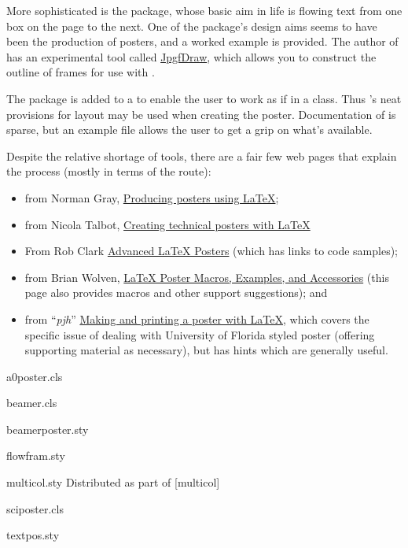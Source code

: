 More sophisticated is the  package, whose basic aim
in life is flowing text from one box on the page to the next.  One of
the package's design aims seems to have been the production of
posters, and a worked example is provided.  The author of
 has an experimental tool called
\href{http://www.dickimaw-books.com/software.html#jpgfdraw}{JpgfDraw}, which
allows you to construct the outline of frames for use with
.

The  package is added to a %
 to enable the user to work
as if in a  class.  Thus 's neat
provisions for layout may be used when creating the poster.
Documentation of  is sparse, but an example file
allows the user to get a grip on what's available.

Despite the relative shortage of tools, there are a fair few web pages
that explain the process (mostly in terms of the 
route):
\begin{itemize}
\item from Norman Gray, %
  \href{http://nxg.me.uk/docs/posters/}{Producing posters using \LaTeX{}};
\item from Nicola Talbot, %
  \href{http://www.dickimaw-books.com/latex/posters/}{Creating technical posters with \LaTeX{}}
\item From Rob Clark %
  \href{http://homepages.inf.ed.ac.uk/robert/posters/advanced.html}{Advanced LaTeX Posters} %
  (which has links to code samples);
\item from Brian Wolven, %
  \href{http://fuse.pha.jhu.edu/~wolven/posters.html}{LaTeX Poster Macros, Examples, and Accessories} %
  (this page also provides macros and other support suggestions); and
\item from ``\emph{pjh}'' %
  \href{http://www.phys.ufl.edu/~pjh/posters/poster_howto_UF.html}{Making and printing a poster with \LaTeX{}}, %
  which covers the specific issue of dealing with University of
  Florida styled poster (offering supporting material as necessary),
  but has hints which are generally useful.
\end{itemize}
\begin{ctanrefs}
\item[a0poster.cls]
\item[beamer.cls]
\item[beamerposter.sty]
\item[flowfram.sty]
\item[multicol.sty]Distributed as part of [multicol]
\item[sciposter.cls]
\item[textpos.sty]
\end{ctanrefs}

